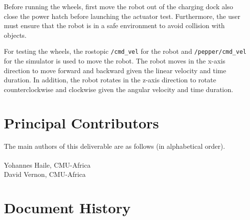 \documentclass{CSSRforAfrica}
\newcommand{\blank}{~\\}
\begin{document}
\begingroup
{}
\begin{tcolorbox}[nobeforeafter,
enhanced,
sharp corners,
toprule=1pt,
bottomrule=1pt,
leftrule=0pt,
rightrule=0pt,
colback=yellow!20,
left skip=\mynote@shift,
right skip=\mynote@shift,
overlay={\node[left] (mynotenode) at ([xshift=-\mynote@shift]frame.west) {\textbf{\textcolor{greenyellow}{Note:}}} ;},]
Before running the wheels, first move the robot out of the charging dock also close the power hatch 
before launching the actuator test. Furthermore, the user must ensure that the robot is in a safe 
environment to avoid collision with objects. 
\end{tcolorbox}
\endgroup

For testing the wheels, the rostopic \texttt{/cmd\_vel} for the robot and \texttt{/pepper/cmd\_vel} for the simulator is 
used to move the robot. The robot moves in the x-axis direction to move forward and backward given the linear velocity 
and time duration. In addition, the robot rotates in the z-axis direction to rotate counterclockwise and clockwise given
the angular velocity and time duration.


\newpage



\newpage

\section*{Principal Contributors}
\label{contributors}
The main authors of this deliverable are as follows (in alphabetical order).
\blank
~
\blank
Yohannes Haile, CMU-Africa\\ 
David Vernon, CMU-Africa\\

\pagebreak
\section*{Document History}
\label{document_history}
\end{document}
